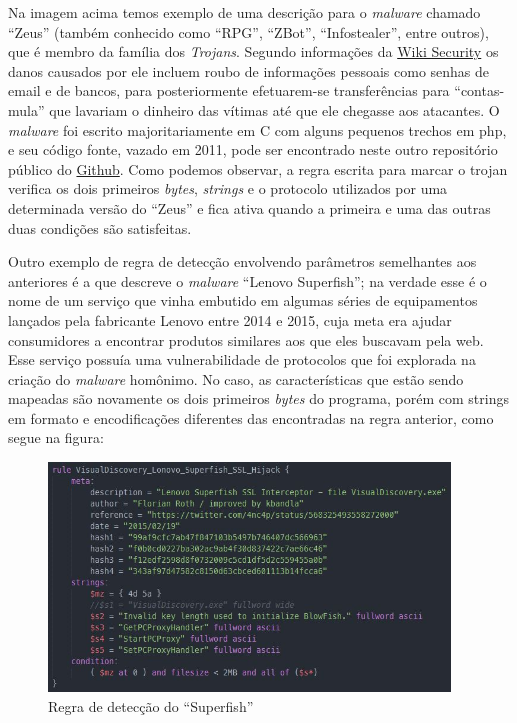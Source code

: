 Na imagem acima temos exemplo de uma descrição para o \textit{malware} chamado ``Zeus''
(também conhecido como ``RPG'', ``ZBot'', ``Infostealer'', entre outros), que é membro da
família dos \textit{Trojans}. Segundo informações da \href{www.wiki-security.com}{Wiki Security}\citeyear{wikisecurity} os danos causados por ele incluem roubo de informações pessoais como senhas de email e de bancos, para posteriormente efetuarem-se transferências para ``contas-mula'' que lavariam o dinheiro das vítimas até
que ele chegasse aos atacantes. O \textit{malware} foi escrito majoritariamente em C
com alguns pequenos trechos em php, e seu código fonte, vazado em 2011, pode
ser encontrado neste outro repositório público do \href{https://github.com/Visgean/Zeus}{Github}.
Como podemos observar, a regra escrita para marcar o trojan verifica os dois primeiros \textit{bytes}, \textit{strings} e o protocolo utilizados por uma determinada versão do ``Zeus'' e fica ativa quando a primeira e uma das outras duas condições são satisfeitas.

Outro exemplo de regra de detecção envolvendo parâmetros semelhantes aos anteriores é a que descreve o \textit{malware} ``Lenovo Superfish''\citeyear{lenovosuperfish}; na verdade esse é o nome de um serviço que vinha embutido em algumas séries de equipamentos lançados pela fabricante Lenovo entre 2014 e 2015, cuja meta era ajudar consumidores a encontrar produtos similares aos que eles buscavam pela web. Esse serviço possuía uma vulnerabilidade de protocolos que foi explorada na criação do \textit{malware} homônimo. No caso, as características que estão sendo mapeadas são novamente os dois primeiros \textit{bytes} do programa, porém com strings em formato e encodificações diferentes das encontradas na regra anterior, como segue na figura:

\begin{figure}[h]
	\centering
	\includegraphics[width=0.95\textwidth]{figs/superfish}
	\caption{Regra de detecção do ``Superfish''}
	\label{f.superfish}
\end{figure}


